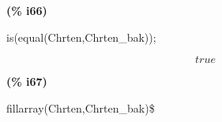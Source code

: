 \documentclass[fleqn]{article}
\begin{document}
\noindent%



\noindent
\begin{minipage}[t]{4.000000em}\color{red}\bfseries
(\% i66)	
\end{minipage}
\begin{minipage}[t]{\textwidth}\color{blue}
is(equal(Chrten,Chrten\_bak));
\end{minipage}
\[\displaystyle \tag{\% o66} 
true\mbox{}
\]


\noindent
\begin{minipage}[t]{4.000000em}\color{red}\bfseries
(\% i67)	
\end{minipage}
\begin{minipage}[t]{\textwidth}\color{blue}
fillarray(Chrten,Chrten\_bak)\$
\end{minipage}

\noindent%
\end{document}
